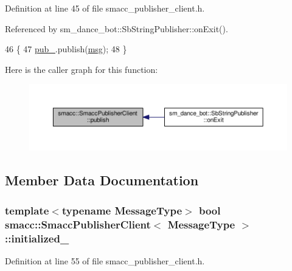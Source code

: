 Definition at line 45 of file smacc\+\_\+publisher\+\_\+client.\+h.



Referenced by sm\+\_\+dance\+\_\+bot\+::\+Sb\+String\+Publisher\+::on\+Exit().


\begin{DoxyCode}
46   \{
47     \hyperlink{classsmacc_1_1SmaccPublisherClient_a1ed34cdd0001bde76450ab4540b11808}{pub\_}.publish(\hyperlink{namespacekeyboard__node_a768777e12f75b89e4a0a60acf748e9eb}{msg});
48   \}
\end{DoxyCode}


Here is the caller graph for this function\+:
\nopagebreak
\begin{figure}[H]
\begin{center}
\leavevmode
\includegraphics[width=350pt]{classsmacc_1_1SmaccPublisherClient_aa635210d9104a5b6f3ea15cb2bf16518_icgraph}
\end{center}
\end{figure}




\subsection{Member Data Documentation}
\subsubsection[{\texorpdfstring{initialized\+\_\+}{initialized_}}]{\setlength{\rightskip}{0pt plus 5cm}template$<$typename Message\+Type$>$ {\bf bool} {\bf smacc\+::\+Smacc\+Publisher\+Client}$<$ Message\+Type $>$\+::initialized\+\_\+\hspace{0.3cm}{\ttfamily [private]}}\hypertarget{classsmacc_1_1SmaccPublisherClient_a89c0b50504971a936d9849cd797db79b}{}\label{classsmacc_1_1SmaccPublisherClient_a89c0b50504971a936d9849cd797db79b}


Definition at line 55 of file smacc\+\_\+publisher\+\_\+client.\+h.



